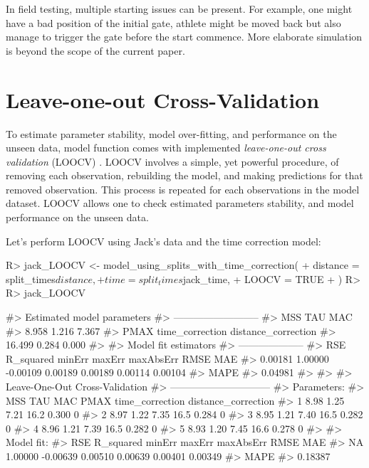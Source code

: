 \documentclass[
]{jss}
\begin{document}
In field testing, multiple starting issues can be present. For example, one might have a bad position of the initial gate, athlete might be moved back but also manage to trigger the gate before the start commence. More elaborate simulation is beyond the scope of the current paper.

\hypertarget{leave-one-out-cross-validation}{%
\section{Leave-one-out Cross-Validation}\label{leave-one-out-cross-validation}}

To estimate parameter stability, model over-fitting, and performance on the unseen data,  model function comes with implemented \emph{leave-one-out cross validation} (LOOCV) \citep{jamesIntroductionStatisticalLearning2017, jovanovicBmbstatsBootstrapMagnitudebased2020, kuhnAppliedPredictiveModeling2018}. LOOCV involves a simple, yet powerful procedure, of removing each observation, rebuilding the model, and making predictions for that removed observation. This process is repeated for each observations in the model dataset. LOOCV allows one to check estimated parameters stability, and model performance on the unseen data.

Let's perform LOOCV using Jack's data and the time correction model:

\begin{CodeChunk}
\begin{CodeInput}
R> jack_LOOCV <- model_using_splits_with_time_correction(
+   distance = split_times$distance,
+   time = split_times$jack_time,
+   LOOCV = TRUE
+ )
R> 
R> jack_LOOCV
\end{CodeInput}
\begin{CodeOutput}
#> Estimated model parameters
#> --------------------------
#>                 MSS                 TAU                 MAC 
#>               8.958               1.216               7.367 
#>                PMAX     time_correction distance_correction 
#>              16.499               0.284               0.000 
#> 
#> Model fit estimators
#> --------------------
#>       RSE R_squared    minErr    maxErr maxAbsErr      RMSE       MAE 
#>   0.00181   1.00000  -0.00109   0.00189   0.00189   0.00114   0.00104 
#>      MAPE 
#>   0.04981 
#> 
#> 
#> Leave-One-Out Cross-Validation
#> ------------------------------
#> Parameters:
#>    MSS  TAU  MAC PMAX time_correction distance_correction
#> 1 8.98 1.25 7.21 16.2           0.300                   0
#> 2 8.97 1.22 7.35 16.5           0.284                   0
#> 3 8.95 1.21 7.40 16.5           0.282                   0
#> 4 8.96 1.21 7.39 16.5           0.282                   0
#> 5 8.93 1.20 7.45 16.6           0.278                   0
#> 
#> Model fit:
#>       RSE R_squared    minErr    maxErr maxAbsErr      RMSE       MAE 
#>        NA   1.00000  -0.00639   0.00510   0.00639   0.00401   0.00349 
#>      MAPE 
#>   0.18387
\end{CodeOutput}
\end{CodeChunk}
\end{document}

